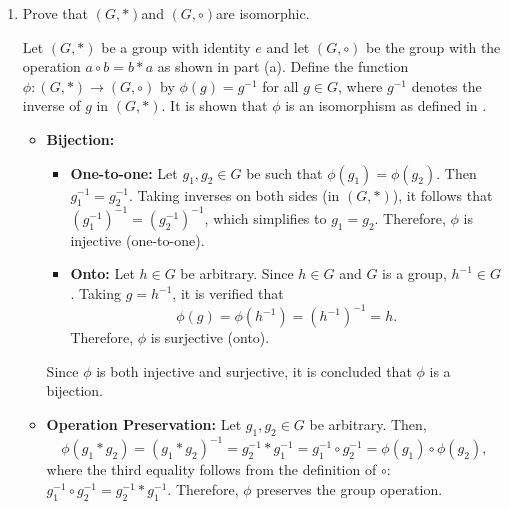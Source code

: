 \begin{enumerate}
\begin{enumerate}
\begin{subprove}
\begin{itemize}
        \item \textbf{Existence of Inverse:} Let $a \in G$ be arbitrary.
        Since $(G, *)$ is a group, there exists $a^{-1} \in G$ such that $a * a^{-1} = a^{-1} * a = e$.
        It is claimed that $a^{-1}$ is the inverse of $a$ in $(G, \circ)$.
        Then,
        \[
          a \circ a^{-1} = a^{-1} * a = e \quad \text{and} \quad a^{-1} \circ a = a * a^{-1} = e.
        \]
        Therefore, every element in $(G, \circ)$ has an inverse.
      \end{itemize}
      
      Since $(G, \circ)$ satisfies all four group axioms, it is concluded by definition of  that $(G, \circ)$ is a group.
    \end{subprove}
    \item Prove that $(G, *)$and $(G, \circ)$are isomorphic.
    \begin{subprove}
      Let $(G, *)$ be a group with identity $e$ and let $(G, \circ)$ be the group with the operation $a \circ b = b * a$ as shown in part (a).
      Define the function $\phi: (G, *) \to (G, \circ)$ by $\phi(g) = g^{-1}$ for all $g \in G$,
      where $g^{-1}$ denotes the inverse of $g$ in $(G, *)$.
      It is shown that $\phi$ is an isomorphism as defined in .
      
      \begin{itemize}
        \item \textbf{Bijection:}
        \begin{itemize}
          \item \textbf{One-to-one:} Let $g_1, g_2 \in G$ be such that $\phi(g_1) = \phi(g_2)$.
          Then $g_1^{-1} = g_2^{-1}$.
          Taking inverses on both sides (in $(G, *)$), it follows that $(g_1^{-1})^{-1} = (g_2^{-1})^{-1}$,
          which simplifies to $g_1 = g_2$.
          Therefore, $\phi$ is injective (one-to-one).
          
          \item \textbf{Onto:} Let $h \in G$ be arbitrary.
          Since $h \in G$ and $G$ is a group, $h^{-1} \in G$.
          Taking $g = h^{-1}$, it is verified that
          \[
            \phi(g) = \phi(h^{-1}) = (h^{-1})^{-1} = h.
          \]
          Therefore, $\phi$ is surjective (onto).
        \end{itemize}
        Since $\phi$ is both injective and surjective, it is concluded that $\phi$ is a bijection.
        
        \item \textbf{Operation Preservation:} Let $g_1, g_2 \in G$ be arbitrary.
        Then,
        \[
          \phi(g_1 * g_2) = (g_1 * g_2)^{-1} = g_2^{-1} * g_1^{-1} = g_1^{-1} \circ g_2^{-1} = \phi(g_1) \circ \phi(g_2),
        \]
        where the third equality follows from the definition of $\circ$: $g_1^{-1} \circ g_2^{-1} = g_2^{-1} * g_1^{-1}$.
        Therefore, $\phi$ preserves the group operation.
      \end{itemize}
      

\end{subprove}
\end{enumerate}
\end{enumerate}
